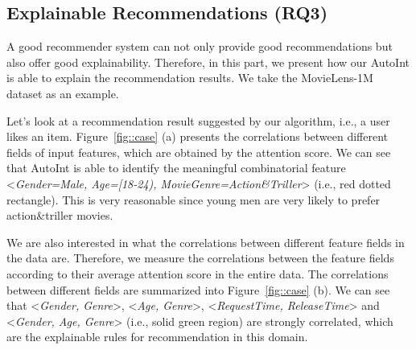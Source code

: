 \subsection{Explainable Recommendations (RQ3)}
A good recommender system can not only provide good recommendations but also offer good explainability. Therefore, in this part, we present how our AutoInt is able to explain the recommendation results. 
We take the MovieLens-1M dataset as an example. 




Let's look at a recommendation result suggested by our algorithm, i.e., a user likes an item. Figure~\ref{fig::case} (a) presents the correlations between different fields of input features, which are obtained by the attention score. We can see that AutoInt is able to identify the meaningful combinatorial feature <\textit{Gender=Male, Age=[18-24), MovieGenre=Action\&Triller}> (i.e., red dotted rectangle). This is very reasonable since young men are very likely to prefer action\&triller movies. 



We are also interested in what the correlations between different feature fields in the data are. Therefore, we measure the correlations between the feature fields according to their average attention score in the entire data. The correlations between different fields are summarized into Figure~\ref{fig::case} (b). We can see that <\textit{Gender, Genre}>, <\textit{Age, Genre}>, <\textit{RequestTime, ReleaseTime}> and <\textit{Gender, Age, Genre}> (i.e., solid green region) are strongly correlated, which are the explainable rules for recommendation in this domain. 




\vspace{-2pt}
